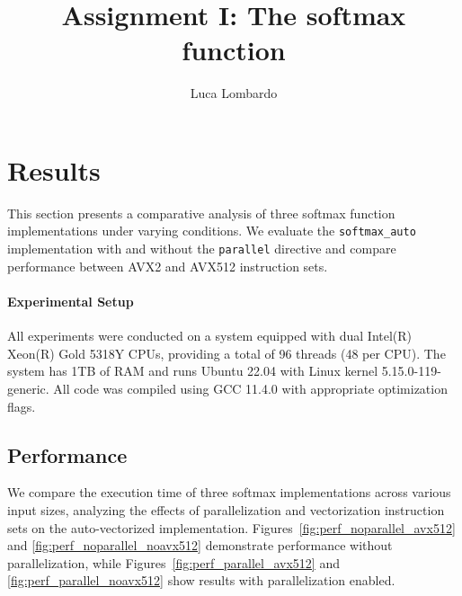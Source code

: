 \documentclass[10pt]{report}
\title{Assignment I: The softmax function}
\author{Luca Lombardo}
\begin{document}
\maketitle


\setlength{\parindent}{0em}
\setlength{\parskip}{-0.5em}

\section*{Results}
This section presents a comparative analysis of three softmax function implementations under varying conditions. We evaluate the \texttt{softmax\_auto} implementation with and without the \texttt{parallel} directive and compare performance between AVX2 and AVX512 instruction sets.

\paragraph{Experimental Setup} All experiments were conducted on a system equipped with dual Intel(R) Xeon(R) Gold 5318Y CPUs, providing a total of 96 threads (48 per CPU). The system has 1TB of RAM and runs Ubuntu 22.04 with Linux kernel 5.15.0-119-generic. All code was compiled using GCC 11.4.0 with appropriate optimization flags.

\subsection*{Performance}

We compare the execution time of three softmax implementations across various input sizes, analyzing the effects of parallelization and vectorization instruction sets on the auto-vectorized implementation. Figures~\ref{fig:perf_noparallel_avx512} and \ref{fig:perf_noparallel_noavx512} demonstrate performance without parallelization, while Figures~\ref{fig:perf_parallel_avx512} and \ref{fig:perf_parallel_noavx512} show results with parallelization enabled.
\end{document}
